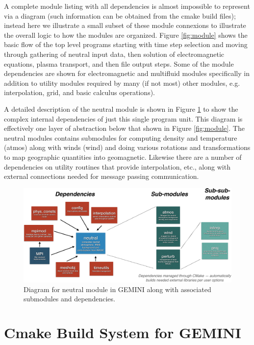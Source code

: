 \documentclass[11pt,letterpaper]{article}
\begin{document}
A complete module listing with all dependencies is almost impossible to represent via a diagram (such information can be obtained from the cmake build files); instead here we illustrate a small subset of these module connexions to illustrate the overall logic to how the modules are organized.  Figure \ref{fig:module} shows the basic flow of the top level programs starting with time step selection and moving through gathering of neutral input data, then solution of electromagnetic equations, plasma transport, and then file output steps.  Some of the module dependencies are shown for electromagnetic and multifluid modules specifically in addition to utility modules required by many (if not most) other modules, e.g. interpolation, grid, and basic calculus operations).  

A detailed description of the neutral module is shown in Figure \ref{fig:neutral} to show the complex internal dependencies of just this single program unit.  This diagram is effectively one layer of abstraction below that shown in Figure \ref{fig:module}.  The neutral modules contains submodules for computing density and temperature (atmos) along with winds (wind) and doing various rotations and transformations to map geographic quantities into geomagnetic.  Likewise there are a number of dependencies on utility routines that provide interpolation, etc., along with external connections needed for message passing communication.  
\begin{figure}
  \includegraphics[width=\textwidth]{./figures/neutral-crop.pdf}
  \caption{Diagram for neutral module in GEMINI along with associated submodules and dependencies.}
  \label{fig:neutral}
\end{figure}



\section{Cmake Build System for GEMINI}
\end{document}
